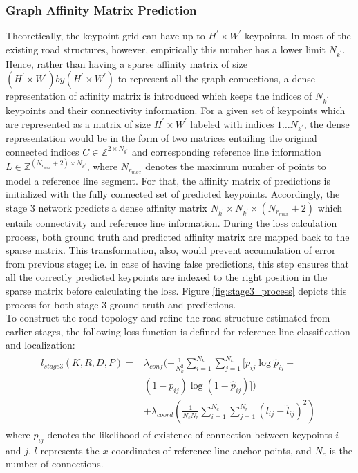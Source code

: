 \documentclass[10pt,twocolumn,letterpaper]{article}
\begin{document}
\subsubsection{Graph Affinity Matrix Prediction} 
Theoretically, the keypoint grid can have up to $H^\prime\times W^\prime$ keypoints. In most of the existing road structures, however, empirically this number has a lower limit $N_{k^\prime}$. Hence, rather than having a sparse affinity matrix of size $(H^\prime\times W^\prime)by(H^\prime\times W^\prime)$ to represent all the graph connections, a dense representation of affinity matrix is introduced which keeps the indices of $N_{k^\prime}$ keypoints and their connectivity information. For a given set of keypoints which are represented as a matrix of size $H^\prime\times W^\prime$ labeled with indices $1\dots N_{k^\prime}$, the dense representation would be in the form of two matrices entailing the original connected indices $C\in \mathbb{Z}^{2\times N_{k^\prime}}$ and corresponding reference line information $L\in \mathbb{Z}^{(N_{r_{max}}+2)\times N_{k^\prime}}$, where $N_{r_{max}}$ denotes the maximum number of points to model a reference line segment. For that, the affinity matrix of predictions is initialized with the fully connected set of predicted keypoints. Accordingly, the stage 3 network predicts a dense affinity matrix $N_{k^\prime}\times N_{k^\prime}\times (N_{r_{max}}+2)$ which entails connectivity and reference line information. During the loss calculation process, both ground truth and predicted affinity matrix are mapped back to the sparse matrix. This transformation, also, would prevent accumulation of error from previous stage; i.e. in case of having false predictions, this step ensures that all the correctly predicted keypoints are indexed to the right position in the sparse matrix before calculating the loss. Figure \ref{fig:stage3_process} depicts this process for both stage 3 ground truth and predictions.\\
To construct the road topology and refine the road structure estimated from earlier stages, the following loss function is defined for reference line classification and localization:
\begin{align}
\begin{split}
  l_{stage3} (K, R, D, P) = & \lambda_{conf}(-\frac{1}{N_k^2}\sum_{i=1}^{N_k} \sum_{j=1}^{N_k}[p_{ij} \log \hat{p}_{ij} + \\
  & (1-p_{ij}) \log (1-\hat{p}_{ij})]) \\
                         & + \lambda_{coord}(\frac{1}{N_c N_r}\sum_{i=1}^{N_c}\sum_{j=1}^{N_r} (l_{ij}-\hat{l}_{ij})^2) \;
\end{split}
\end{align}
where $p_{ij}$ denotes the likelihood of existence of connection between keypoints $i$ and $j$, $l$ represents the $x$ coordinates of reference line anchor points, and $N_c$ is the number of connections.
\end{document}

